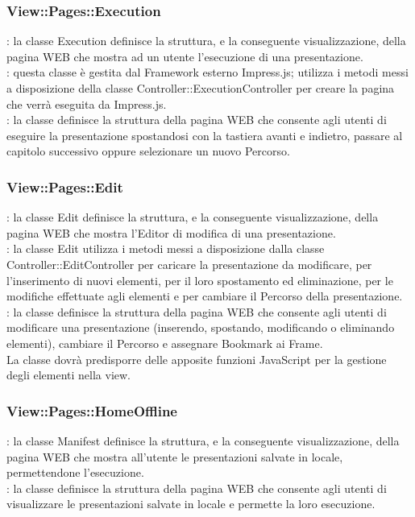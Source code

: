{{		\subsubsection{View::\-Pages::\-Execution}{
			\textbf{\tipo}: la classe Execution definisce la struttura, e la conseguente visualizzazione, della pagina WEB che mostra ad un utente l'esecuzione di una presentazione.\\
			\textbf{\relaz}: questa classe è gestita dal Framework esterno Impress.js; utilizza i metodi messi a disposizione della classe Controller::\-ExecutionController per creare la pagina che verrà eseguita da Impress.js.\\
			\textbf{\attivita}: la classe definisce la struttura della pagina WEB che consente agli utenti di eseguire la presentazione spostandosi con la tastiera avanti e indietro, passare al capitolo successivo oppure selezionare un nuovo Percorso.
		}
		\subsubsection{View::\-Pages::\-Edit}{
			\textbf{\tipo}: la classe Edit definisce la struttura, e la conseguente visualizzazione, della pagina WEB che mostra l'Editor di modifica di una presentazione.\\
			\textbf{\relaz}: la classe Edit utilizza i metodi messi a disposizione dalla classe Controller::\-EditController per caricare la presentazione da modificare, per l'inserimento di nuovi elementi, per il loro spostamento ed eliminazione, per le modifiche  effettuate agli elementi e per cambiare il Percorso della presentazione.\\
			\textbf{\attivita}: la classe definisce la struttura della pagina WEB che consente agli utenti di modificare una presentazione (inserendo, spostando, modificando o eliminando elementi), cambiare il Percorso e assegnare Bookmark\ped{g} ai Frame.\\
			La classe dovrà predisporre delle apposite funzioni JavaScript per la gestione degli elementi nella view.
		}

		
		\subsubsection{View::\-Pages::\-HomeOffline}{
			\textbf{\tipo}: la classe Manifest definisce la struttura, e la conseguente visualizzazione, della pagina WEB che mostra all'utente le presentazioni salvate in locale, permettendone l'esecuzione.\\
			\textbf{\attivita}: la classe definisce la struttura della pagina WEB che consente agli utenti di visualizzare le presentazioni salvate in locale e permette la loro esecuzione.\\
		}
}}
